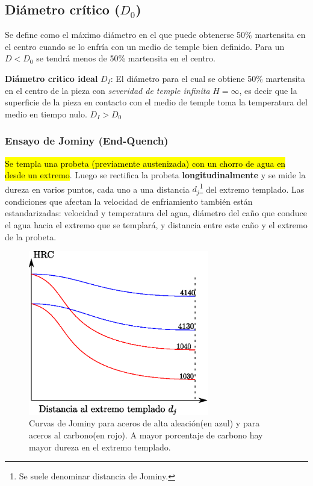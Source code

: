 \setcounter{footnote}{0}

\subsection[Diámetro crítico]{Diámetro crítico ($D_0$)}
 Se define como el máximo diámetro en el que puede obtenerse 50\% martensita en el centro cuando se lo enfría con un medio de temple bien definido. Para un $D<D_0$ se tendrá menos de 50\% martensita en el centro.

\textbf{Diámetro critico ideal} $D_{I}$: El diámetro para el cual se obtiene 50\% martensita en el centro de la pieza con \textit{severidad de temple infinita} $H=\infty$, es decir que la superficie de la pieza en contacto con el medio de temple toma la temperatura del medio en tiempo nulo. $D_{I}>D_0$

\subsubsection{Ensayo de Jominy (End-Quench)}
\hl{Se templa una probeta (previamente austenizada) con un chorro de agua en desde un extremo}. Luego se rectifica la probeta \textbf{longitudinalmente} y se mide la dureza en varios puntos, cada uno a una distancia $d_j$\footnote{Se suele denominar distancia de Jominy.} del extremo templado. Las condiciones que afectan la velocidad de enfriamiento también están estandarizadas: velocidad y temperatura del agua, diámetro del caño que conduce el agua hacia el extremo que se templará, y distancia entre este caño y el extremo de la probeta.

\begin{figure}[htb!]
    \centering
    \includegraphics[width=0.7\textwidth]{fig/jominy.eps}
    \caption{Curvas de Jominy para aceros de alta aleación(en {\color{blue} azul}) y para aceros al carbono(en {\color{red} rojo}). A mayor porcentaje de carbono hay mayor dureza en el extremo templado.}
    \label{fig:jominy}
\end{figure}

